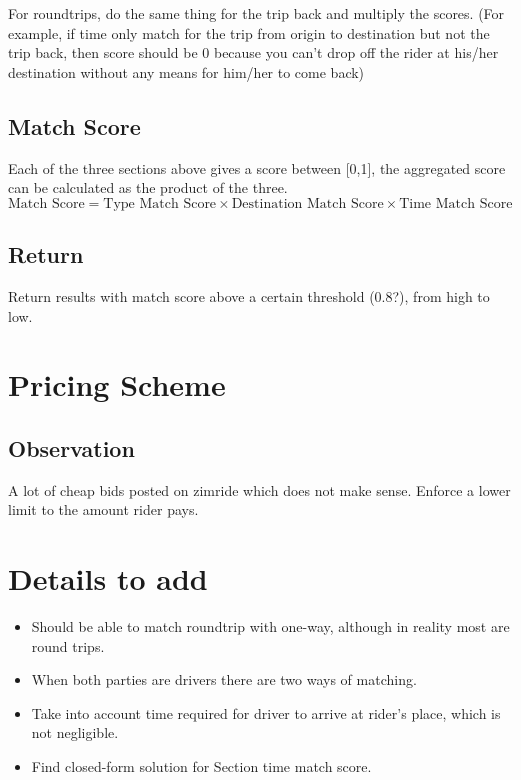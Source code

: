 \documentclass{article}
\begin{document}
For roundtrips, do the same thing for the trip back and multiply the scores.  (For example, if time only match for the trip from origin to destination but not the trip back, then score should be 0 because you can't drop off the rider at his/her destination without any means for him/her to come back)

\subsection{Match Score}
Each of the three sections above gives a score between [0,1], the aggregated score can be calculated as the product of the three.
\begin{equation*}
\mbox{Match Score} = \mbox{Type Match Score} \times \mbox{Destination Match Score} \times \mbox{Time Match Score}
\end{equation*}

\subsection{Return}
Return results with match score above a certain threshold (0.8?), from high to low.

\section{Pricing Scheme}
\subsection{Observation}
A lot of cheap bids posted on zimride which does not make sense.  Enforce a lower limit to the amount rider pays.

\section{Details to add}
\begin{itemize}
\item Should be able to match roundtrip with one-way, although in reality most are round trips.
\item When both parties are drivers there are two ways of matching.
\item Take into account time required for driver to arrive at rider's place, which is not negligible.
\item Find closed-form solution for Section time match score.
\end{itemize}
\end{document}
